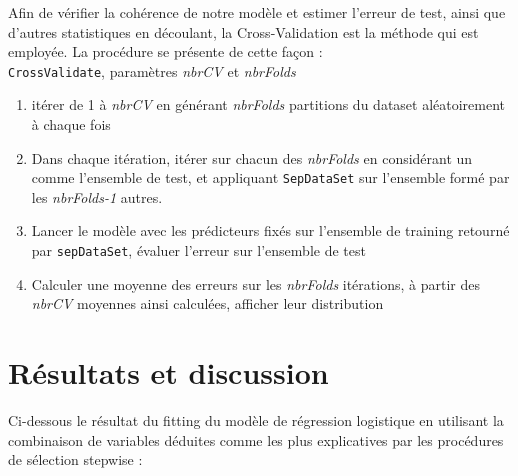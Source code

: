 \documentclass[]{article}
\begin{document}
Afin de vérifier la cohérence de notre modèle et estimer l'erreur de test, ainsi que d'autres statistiques en découlant, la Cross-Validation est la méthode qui est employée. La procédure se présente de cette façon :
~\\
\indent \texttt{CrossValidate}, paramètres \textit{nbrCV} et \textit{nbrFolds}
\begin{enumerate}
\item itérer de 1 à \textit{nbrCV} en générant \textit{nbrFolds} partitions du dataset aléatoirement à chaque fois
\item Dans chaque itération, itérer sur chacun des \textit{nbrFolds} en considérant un comme l'ensemble de test, et appliquant \texttt{SepDataSet} sur l'ensemble formé par les \textit{nbrFolds-1} autres.
\item Lancer le modèle avec les prédicteurs fixés sur l'ensemble de training retourné par \texttt{sepDataSet}, évaluer l'erreur sur l'ensemble de test
\item Calculer une moyenne des erreurs sur les \textit{nbrFolds} itérations, à partir des \textit{nbrCV} moyennes ainsi calculées, afficher leur distribution   
\end{enumerate}

\newpage

\section{Résultats et discussion}

Ci-dessous le résultat du fitting du modèle de régression logistique en utilisant la combinaison de variables déduites comme les plus explicatives par les procédures de sélection stepwise :
\end{document}
